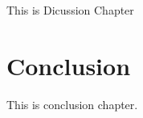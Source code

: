 \documentclass[12pt]{report}
\begin{document}
This is Dicussion Chapter

\chapter[Conclusion]{Conclusion}
\label{chap:conclusion}

This is conclusion chapter.

%
%
\clearpage 
\renewcommand\baselinestretch{1.0}


%
\begin{appendices}

\end{appendices}
\end{document}
